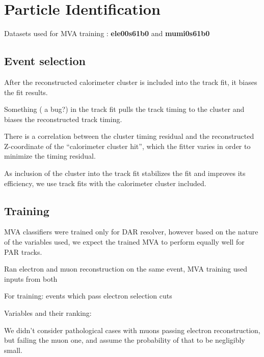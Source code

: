 
\section{Particle Identification}

Datasets used for MVA training : {\bf ele00s61b0} and {\bf mumi0s61b0}


\subsection {Event selection}

After the reconstructed calorimeter cluster is included into the track fit, it biases the fit results.

Something ( a bug?) in the track fit pulls the track timing to the cluster and biases
the reconstructed track timing.

There  is a correlation between the cluster timing residual and the reconstructed Z-coordinate of the
``calorimeter cluster hit'', which the fitter varies in order to minimize the timing residual.

As inclusion of the cluster into the track fit stabilizes the fit and improves its efficiency,
we use track fits with the calorimeter cluster included.

\subsection {Training}

MVA classifiers were trained only for DAR resolver, however based on the nature of 
the variables used, we expect the trained MVA to perform equally well for PAR tracks.

Ran electron and muon reconstruction on the same event, MVA training used inputs from both

For training: events which pass electron selection cuts

Variables and their ranking:

We didn't consider pathological cases with muons passing electron reconstruction, but failing
the muon one, and assume the probability of that to be negligibly small.

